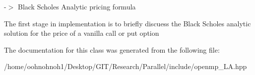 -\/$>$ Black Scholes Analytic pricing formula

The first stage in implementation is to briefly discuess the Black Scholes analytic solution for the price of a vanilla call or put option 

The documentation for this class was generated from the following file\+:\begin{DoxyCompactItemize}
\item 
/home/oohnohnoh1/\+Desktop/\+G\+I\+T/\+Research/\+Parallel/include/openmp\+\_\+\+L\+A.\+hpp\end{DoxyCompactItemize}
